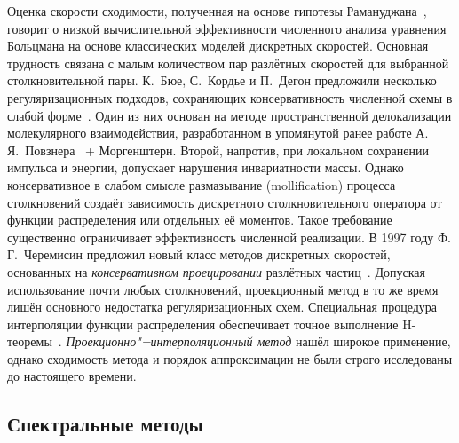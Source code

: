 Оценка скорости сходимости, полученная на основе гипотезы Рамануджана~\cite{Ramanujan1916},
говорит о низкой вычислительной эффективности численного анализа уравнения Больцмана
на основе классических моделей дискретных скоростей. Основная трудность связана с малым количеством
пар разлётных скоростей для выбранной столкновительной пары.
К.~Бюе, С.~Кордье и П.~Дегон предложили несколько регуляризационных подходов,
сохраняющих консервативность численной схемы в слабой форме~\cite{Buet1998}.
Один из них основан на методе пространственной делокализации молекулярного взаимодействия,
разработанном в упомянутой ранее работе А.\,Я.~Повзнера~\cite{Povzner1962} + Моргенштерн.
Второй, напротив, при локальном сохранении импульса и энергии, допускает нарушения инвариатности массы.
Однако консервативное в слабом смысле размазывание (mollification) процесса столкновений
создаёт зависимость дискретного столкновительного оператора от функции распределения
или отдельных её моментов. Такое требование существенно ограничивает эффективность численной реализации.
В 1997 году Ф.\,Г.~Черемисин предложил новый класс методов дискретных скоростей,
основанных на \emph{консервативном проецировании} разлётных частиц~\cite{Tcheremissine1997, Tcheremissine1998}.
Допуская использование почти любых столкновений,
проекционный метод в то же время лишён основного недостатка регуляризационных схем.
Специальная процедура интерполяции функции распределения обеспечивает точное выполнение H-теоремы~\cite{Tcheremissine2000}.
\emph{Проекционно"=интерполяционный метод} нашёл широкое применение,
однако сходимость метода и порядок аппроксимации не были строго исследованы до настоящего времени.



\subsection{Спектральные методы}

